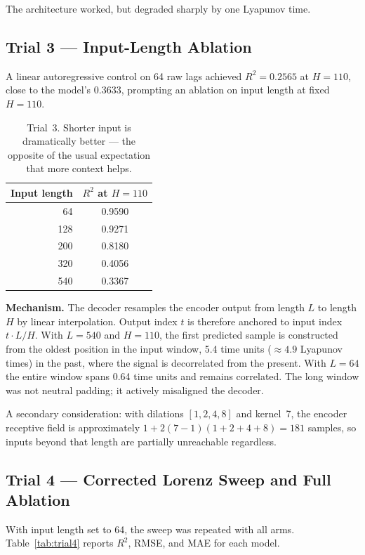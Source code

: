 \documentclass[11pt,a4paper]{article}
\begin{document}
The architecture worked, but degraded sharply by one Lyapunov time.


\subsection{Trial 3 --- Input-Length Ablation}

A linear autoregressive control on 64 raw lags achieved $R^2 = 0.2565$ at $H = 110$, close to the model's 0.3633, prompting an ablation on input length at fixed $H = 110$.

\begin{table}[H]
\centering
\caption{Trial~3. Shorter input is dramatically better --- the opposite of the usual expectation that more context helps.}
\begin{tabular}{rc}
\toprule
\textbf{Input length} & $R^2$ \textbf{at} $H = 110$ \\
\midrule
64  & 0.9590 \\
128 & 0.9271 \\
200 & 0.8180 \\
320 & 0.4056 \\
540 & 0.3367 \\
\bottomrule
\end{tabular}
\end{table}

\textbf{Mechanism.}
The decoder resamples the encoder output from length $L$ to length $H$ by linear interpolation.
Output index $t$ is therefore anchored to input index $t \cdot L/H$.
With $L = 540$ and $H = 110$, the first predicted sample is constructed from the oldest position in the input window, 5.4 time units ($\approx 4.9$ Lyapunov times) in the past, where the signal is decorrelated from the present.
With $L = 64$ the entire window spans 0.64 time units and remains correlated.
The long window was not neutral padding; it actively misaligned the decoder.

A secondary consideration: with dilations $[1, 2, 4, 8]$ and kernel~7, the encoder receptive field is approximately $1 + 2(7-1)(1+2+4+8) = 181$ samples, so inputs beyond that length are partially unreachable regardless.


\subsection{Trial 4 --- Corrected Lorenz Sweep and Full Ablation}

With input length set to 64, the sweep was repeated with all arms.
Table~\ref{tab:trial4} reports $R^2$, RMSE, and MAE for each model.
\end{document}
